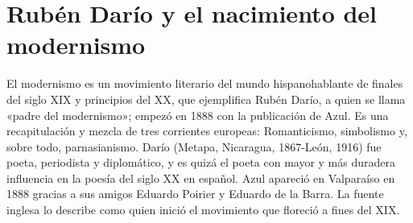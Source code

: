 \documentclass{book}
\begin{document}

\section{Rubén Darío y el nacimiento del modernismo}

El modernismo es un movimiento literario del mundo hispanohablante de finales del siglo XIX y principios del XX, que ejemplifica Rubén Darío, a quien se llama «padre del modernismo»; empezó en 1888 con la publicación de Azul. Es una recapitulación y mezcla de tres corrientes europeas: Romanticismo, simbolismo y, sobre todo, parnasianismo. Darío (Metapa, Nicaragua, 1867-León, 1916) fue poeta, periodista y diplomático, y es quizá el poeta con mayor y más duradera influencia en la poesía del siglo XX en español. Azul apareció en Valparaíso en 1888 gracias a sus amigos Eduardo Poirier y Eduardo de la Barra. La fuente inglesa lo describe como quien inició el movimiento que floreció a fines del XIX.

\end{document}
